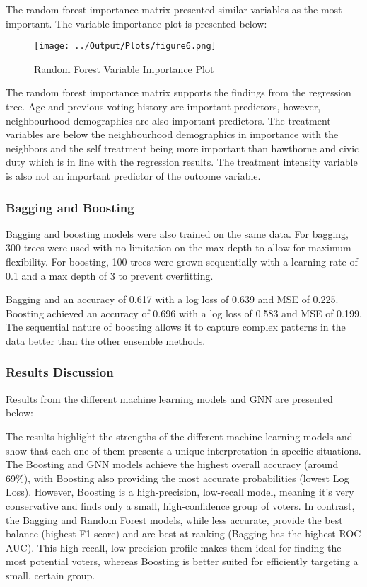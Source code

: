 \documentclass[11pt]{article}
\begin{document}
The random forest importance matrix presented similar variables as the most important. The variable importance plot is presented below:
\begin{figure}[H]
    \centering
    \texttt{[image: ../Output/Plots/figure6.png]}   
    \caption{Random Forest Variable Importance Plot}
    \label{fig:random_forest}
\end{figure}
The random forest importance matrix supports the findings from the regression tree. Age and previous voting history are important predictors, however, neighbourhood demographics are also important predictors. The treatment variables are below the neighbourhood demographics in importance with the neighbors and the self treatment being more important than hawthorne and civic duty which is in line with the regression results. The treatment intensity variable is also not an important predictor of the outcome variable.

\subsubsection{Bagging and Boosting}
Bagging and boosting models were also trained on the same data. For bagging, 300 trees were used with no limitation on the max depth to allow for maximum flexibility. For boosting, 100 trees were grown sequentially with a learning rate of 0.1 and a max depth of 3 to prevent overfitting.

Bagging and an accuracy of 0.617 with a log loss of 0.639 and MSE of 0.225. Boosting achieved an accuracy of 0.696 with a log loss of 0.583 and MSE of 0.199. The sequential nature of boosting allows it to capture complex patterns in the data better than the other ensemble methods.

\subsubsection{Results Discussion}
Results from the different machine learning models and GNN are presented below:


The results highlight the strengths of the different machine learning models and show that each one of them presents a unique interpretation in specific situations. The Boosting and GNN models achieve the highest overall accuracy (around 69\%), with Boosting also providing the most accurate probabilities (lowest Log Loss). However, Boosting is a high-precision, low-recall model, meaning it's very conservative and finds only a small, high-confidence group of voters. In contrast, the Bagging and Random Forest models, while less accurate, provide the best balance (highest F1-score) and are best at ranking (Bagging has the highest ROC AUC). This high-recall, low-precision profile makes them ideal for finding the most potential voters, whereas Boosting is better suited for efficiently targeting a small, certain group.
\end{document}
